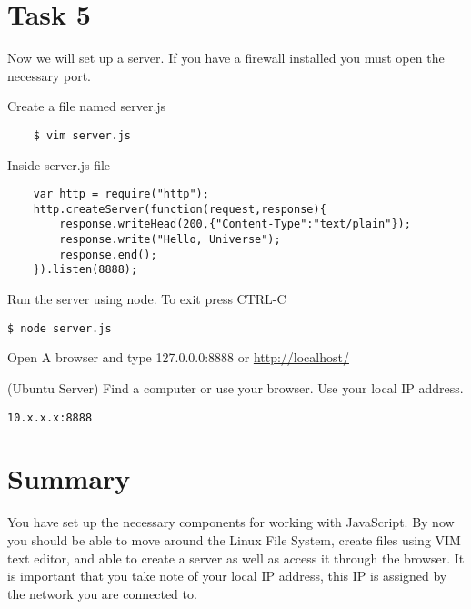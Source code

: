 \documentclass[12pt]{article}
\begin{document}
\section*{Task 5}
Now we will set up a server. If you have a firewall installed you must open the necessary port. 
\begin{todolist}
    \item Create a file named server.js 
    \begin{lstlisting}
    $ vim server.js 
    \end{lstlisting} 
    Inside server.js file 
    \begin{lstlisting}
    var http = require("http");
    http.createServer(function(request,response){
        response.writeHead(200,{"Content-Type":"text/plain"});
        response.write("Hello, Universe");
        response.end();
    }).listen(8888);
    \end{lstlisting} 
\item Run the server using node. To exit press CTRL-C
\begin{lstlisting}
$ node server.js 
\end{lstlisting}
\item Open A browser and type 127.0.0.0:8888 or \href{http://localhost:8888}{http://localhost/}
\item (Ubuntu Server) Find a computer or use your browser. Use your local IP address. 
\begin{lstlisting}
10.x.x.x:8888
\end{lstlisting}
\end{todolist}
\section*{Summary}
You have set up the necessary components for working with JavaScript. By now you should be able to move around the Linux File System, create files using VIM text editor, and able to create a server as well as access it through the browser. It is important that you take note of your local IP address, this IP is assigned by the network you are connected to. 
\end{document}
